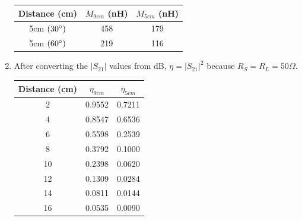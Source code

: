 \documentclass{article}
\begin{document}
\begin{enumerate}
	\begin{table}[h]
	\centering
		\begin{tabular}{|c|c|c|}
		\hline
		Distance (cm)	  & $M_{9cm}$ (nH) & $M_{5cm}$ (nH) \\ \hline
		5cm $(30\degree)$ & 458 		   & 179   			\\ \hline
		5cm $(60\degree)$ & 219 		   & 116 		    \\ \hline
		\end{tabular}
	\end{table}

	\item After converting the $\vert S_{21}\vert$ values from dB, $\eta = \vert S_{21}\vert^2$ because $R_S = R_L = 50\Omega$. 
	\begin{table}[H]
	\centering
		\begin{tabular}{|c|c|c|}
		\hline
		Distance (cm) & $\eta_{9cm}$ & $\eta_{5cm}$ \\ \hline
		2  & 0.9552 & 0.7211 \\ \hline
		4  & 0.8547 & 0.6536 \\ \hline
		6  & 0.5598 & 0.2539 \\ \hline
		8  & 0.3792 & 0.1000 \\ \hline
		10 & 0.2398 & 0.0620 \\ \hline
		12 & 0.1309 & 0.0284 \\ \hline
		14 & 0.0811 & 0.0144 \\ \hline
		16 & 0.0535 & 0.0090 \\ \hline
		\end{tabular}
	\end{table} 
\end{enumerate}
\end{document}
